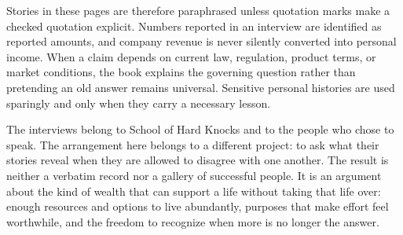 Stories in these pages are therefore paraphrased unless quotation marks make a
checked quotation explicit. Numbers reported in an interview are identified as
reported amounts, and company revenue is never silently converted into personal
income. When a claim depends on current law, regulation, product terms, or
market conditions, the book explains the governing question rather than
pretending an old answer remains universal. Sensitive personal histories are
used sparingly and only when they carry a necessary lesson.

The interviews belong to School of Hard Knocks and to the people who chose to
speak. The arrangement here belongs to a different project: to ask what their
stories reveal when they are allowed to disagree with one another. The result
is neither a verbatim record nor a gallery of successful people. It is an
argument about the kind of wealth that can support a life without taking that
life over:
enough resources and options to live abundantly, purposes that make effort feel
worthwhile, and the freedom to recognize when more is no longer the answer.
